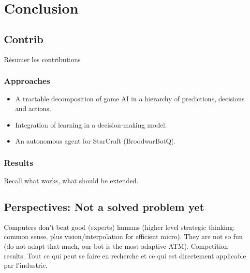\chapter{Conclusion}

\section{Contrib}
Résumer les contributions
\subsection{Approaches}
\begin{itemize}
\item A tractable decomposition of game AI in a hierarchy of predictions, decisions and actions.
\item Integration of learning in a decision-making model. 
\item An autonomous agent for StarCraft (BroodwarBotQ).
\end{itemize}

\subsection{Results}
Recall what works, what should be extended.

\section{Perspectives: Not a solved problem yet}
Computers don't beat good (experts) humans (higher level strategic thinking: common sense, plus vision/interpolation for efficient micro). They are not so fun (do not adapt that much, our bot is the most adaptive ATM). Competition results.
Tout ce qui peut se faire en recherche et ce qui est directement applicable par l'industrie.


